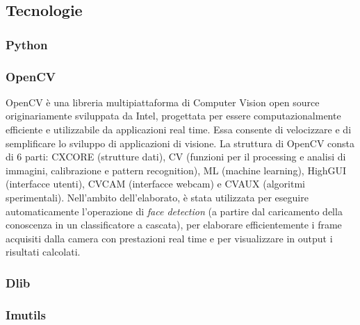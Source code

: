 \documentclass[12pt]{article}
\begin{document}
\subsection{Tecnologie}

\subsubsection{Python}


\subsubsection{OpenCV}
\label{subsec:opencv}
OpenCV è una libreria multipiattaforma di Computer Vision open source originariamente sviluppata da Intel, progettata per essere computazionalmente efficiente e utilizzabile da applicazioni real time. Essa consente di velocizzare e di semplificare lo sviluppo di applicazioni di visione. La struttura di OpenCV consta di 6 parti: CXCORE (strutture dati), CV (funzioni per il processing e analisi di immagini, calibrazione e pattern recognition), ML (machine learning), HighGUI (interfacce utenti), CVCAM (interfacce webcam) e CVAUX (algoritmi sperimentali). Nell'ambito dell'elaborato, è stata utilizzata per eseguire automaticamente l'operazione di \textit{face detection} (a partire dal caricamento della conoscenza in un classificatore a cascata), per elaborare efficientemente i frame acquisiti dalla camera con prestazioni real time e per visualizzare in output i risultati calcolati.

\subsubsection{Dlib}
\label{subsec:dlib}

\subsubsection{Imutils}
\label{subsec:imutils}





\end{document}
